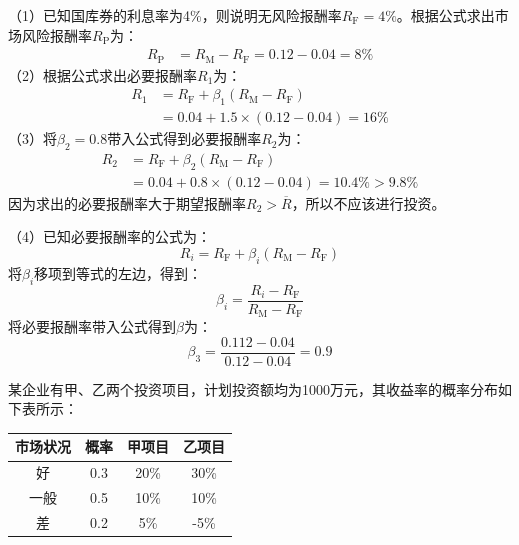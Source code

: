\documentclass[
  10pt,
  twoside,
  openany,
  b5paper, %
  colorscheme = black, %
  xits = false,
]{qyxf-book}
\begin{document}
\begin{note}
	（1）已知国库券的利息率为4\%，则说明无风险报酬率$R_\mathrm{F} = 4\%$。根据公式求出市场风险报酬率$R_\mathrm{P}$为：
	\begin{equation*}
		\begin{aligned}
				R_\mathrm{P} &= R_\mathrm{M} - R_\mathrm{F} =0.12 - 0.04 =8\%
		\end{aligned}
	\end{equation*}
	（2）根据公式求出必要报酬率$R_1$为：
	\begin{equation*}
		\begin{aligned}
			R_1 &= R_\mathrm{F} + \beta_1 (R_\mathrm{M} - R_\mathrm{F}) \\
			&= 0.04 + 1.5 \times (0.12-0.04) = 16\%
		\end{aligned}
	\end{equation*}
	（3）将$\beta_2 =0.8$带入公式得到必要报酬率$R_2$为：
	\begin{equation*}
		\begin{aligned}
			R_2 &= R_\mathrm{F} + \beta_2 (R_\mathrm{M} - R_\mathrm{F}) \\
			&= 0.04 + 0.8 \times (0.12-0.04) = 10.4\% > 9.8\%
		\end{aligned}
	\end{equation*}
	因为求出的必要报酬率大于期望报酬率$R_2 > \overline{R}$，所以不应该进行投资。
	
	（4）已知必要报酬率的公式为：
	\begin{equation*}
		R_i = R_\mathrm{F} + \beta_i (R_\mathrm{M}- R_\mathrm{F})
	\end{equation*}
	将$\beta_i$移项到等式的左边，得到：
	\begin{equation*}
		\beta_i = \frac{R_i-R_\mathrm{F}}{R_\mathrm{M}-R_\mathrm{F}}
	\end{equation*}
	将必要报酬率带入公式得到$\beta$为：
	\begin{equation*}
		\beta_3 = \frac{0.112-0.04}{0.12-0.04} = 0.9
	\end{equation*}
\end{note}
	
 某企业有甲、乙两个投资项目，计划投资额均为1000万元，其收益率的概率分布如下表所示：

\begin{center}
	\begin{tabular}{cccc}
		\toprule
		市场状况 & 概率 & 甲项目 & 乙项目 \\
		\midrule
		好 & 0.3 & 20\% & 30\% \\
		一般 & 0.5 & 10\% & 10\% \\
		差 & 0.2 & 5\% & -5\% \\ 
		\bottomrule
	\end{tabular}
\end{center}
\end{document}
